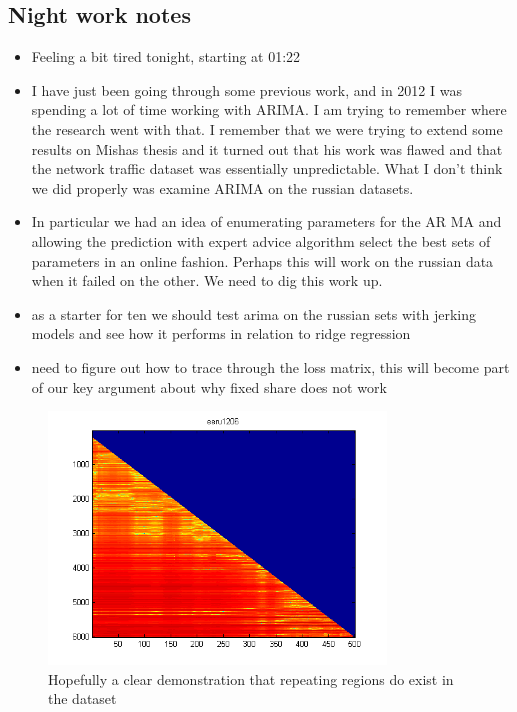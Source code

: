 \documentclass[envcountsame]{llncs}
\begin{document}
\subsection{Night work notes}

\begin{itemize}
\item Feeling a bit tired tonight, starting at 01:22
\item I have just been going through some previous work, and in 2012 I was spending a lot of time working with ARIMA. I am trying to remember where the research went with that. I remember that we were trying to extend some results on Mishas thesis and it turned out that his work was flawed and that the network traffic dataset was essentially unpredictable. What I don't think we did properly was examine ARIMA on the russian datasets.
\item In particular we had an idea of enumerating parameters for the AR MA and allowing the prediction with expert advice algorithm select the best sets of parameters in an online fashion. Perhaps this will work on the russian data when it failed on the other. We need to dig this work up.
\item as a starter for ten we should test arima on the russian sets with jerking models and see how it performs in relation to ridge regression
\item need to figure out how to trace through the loss matrix, this will become part of our key argument about why fixed share does not work	
\end{itemize}


\begin{figure}
\centering
\includegraphics[width=0.8\textwidth]{images/reallareregions}
\caption{Hopefully a clear demonstration that repeating regions do exist in the dataset}
\label{fig:regionsexist}
\end{figure} 
\end{document}
